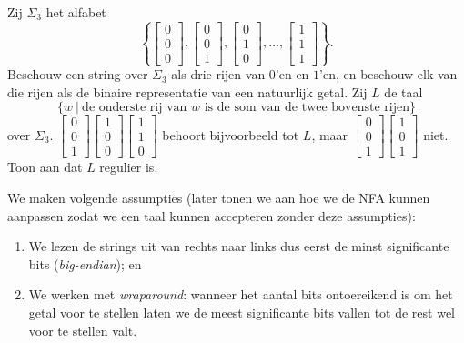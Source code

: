 \documentclass[a4paper]{article}
\newcommand{\kolom}[1]{ \left[ \begin{array}{c} #1 \end{array} \right] }
\begin{document}
\begin{question}
Zij $\Sigma_3$ het alfabet 
{\tiny
	\[ \left\{ \kolom{ 0 \\ 0 \\ 0}, \kolom{ 0 \\ 0 \\ 1}, \kolom{ 0 \\ 1 \\ 0}, \ldots, \kolom{ 1 \\ 1 \\ 1} \right\}. \]
}
Beschouw een string over $\Sigma_3$ als drie rijen van $0$'en en $1$'en, en beschouw elk van die rijen als de binaire representatie van een natuurlijk getal. Zij $L$ de taal 
\[ \{ w \ | \ \mbox{de onderste rij van $w$ is de som van de twee bovenste rijen} \} \]
over $\Sigma_3$. {\tiny $\kolom{ 0 \\ 0 \\ 1} \kolom{ 1 \\ 0 \\ 0} \kolom{ 1 \\ 1 \\ 0}$} behoort bijvoorbeeld tot $L$, maar { \tiny $\kolom{ 0 \\0 \\ 1} \kolom{ 1 \\ 0 \\ 1}$} niet. Toon aan dat $L$ regulier is.
\begin{answer}
We maken volgende assumpties (later tonen we aan hoe we de NFA kunnen aanpassen zodat we een taal kunnen accepteren zonder deze assumpties):
\begin{enumerate}
 \item We lezen de strings uit van rechts naar links dus eerst de minst significante bits (\emph{big-endian}); en
 \item We werken met \emph{wraparound}: wanneer het aantal bits ontoereikend is om het getal voor te stellen laten we de meest significante bits vallen tot de rest wel voor te stellen valt.
\end{enumerate}

\end{answer}
\end{question}
\end{document}
